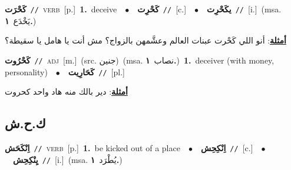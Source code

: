 \documentclass[10pt,a4paper,twoside]{article} %
\begin{document}
\begin{multicols}{2}
{\setlength\topsep{0pt}\textbf{\foreignlanguage{arabic}{كَحْرَت}}\ {\color{gray}\texttt{//}\color{black}}\ \textsc{verb}\ [p.]\ \textbf{1.}~deceive\ \ $\bullet$\ \ \setlength\topsep{0pt}\textbf{\foreignlanguage{arabic}{كَحْرِت}}\ {\color{gray}\texttt{//}\color{black}}\ [c.]\ \ $\bullet$\ \ \setlength\topsep{0pt}\textbf{\foreignlanguage{arabic}{يكَحْرِت}}\ {\color{gray}\texttt{//}\color{black}}\ [i.]\ \color{gray}(msa. \foreignlanguage{arabic}{يَخْدَع}~\foreignlanguage{arabic}{\textbf{١.}})\color{black}\  \begin{flushright}\color{gray}\foreignlanguage{arabic}{\textbf{\underline{\foreignlanguage{arabic}{أمثلة}}}: أنو اللي كَحْرت  عبنات العالم وعشَّمهن بالزواج؟ مش أنت يا هامل يا سقيطة؟}\end{flushright}\color{black}} \vspace{2mm}

{\setlength\topsep{0pt}\textbf{\foreignlanguage{arabic}{كَحْرُوت}}\ {\color{gray}\texttt{//}\color{black}}\ \textsc{adj}\ [m.]\ (src. \color{gray}\foreignlanguage{arabic}{جنين}\color{black})\ \color{gray}(msa. \foreignlanguage{arabic}{نصاب}~\foreignlanguage{arabic}{\textbf{١.}})\color{black}\ \textbf{1.}~deceiver (with money, personality)\ \ $\bullet$\ \ \setlength\topsep{0pt}\textbf{\foreignlanguage{arabic}{كَحَارِيت}}\ {\color{gray}\texttt{//}\color{black}}\ [pl.]\  \begin{flushright}\color{gray}\foreignlanguage{arabic}{\textbf{\underline{\foreignlanguage{arabic}{أمثلة}}}: دير بالك منه هاد واحد كحروت}\end{flushright}\color{black}} \vspace{2mm}

\vspace{-3mm}
\subsection*{\color{blue}\foreignlanguage{arabic}{ك.ح.ش}\color{blue}{}} 

{\setlength\topsep{0pt}\textbf{\foreignlanguage{arabic}{اِنْكَحَش}}\ {\color{gray}\texttt{//}\color{black}}\ \textsc{verb}\ [p.]\ \textbf{1.}~be kicked out of a place\ \ $\bullet$\ \ \setlength\topsep{0pt}\textbf{\foreignlanguage{arabic}{اِنْكِحِش}}\ {\color{gray}\texttt{//}\color{black}}\ [c.]\ \ $\bullet$\ \ \setlength\topsep{0pt}\textbf{\foreignlanguage{arabic}{يِنْكِحِش}}\ {\color{gray}\texttt{//}\color{black}}\ [i.]\ \color{gray}(msa. \foreignlanguage{arabic}{يُطْرَد}~\foreignlanguage{arabic}{\textbf{١.}})\color{black}\ } \vspace{2mm}


\end{multicols}
\end{document}
